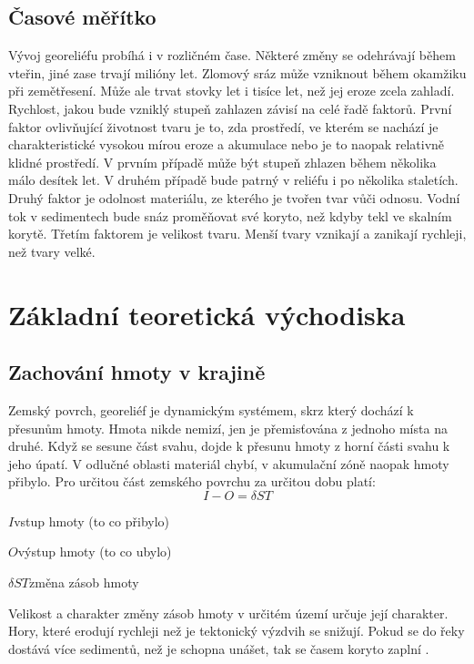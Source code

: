 {\subsection{Časové měřítko}
Vývoj georeliéfu probíhá i v rozličném čase. Některé změny se odehrávají během vteřin, jiné zase trvají milióny let. Zlomový sráz může vzniknout během okamžiku při zemětřesení. Může ale trvat stovky let i tisíce let, než jej eroze zcela zahladí. Rychlost, jakou bude vzniklý stupeň zahlazen závisí na celé řadě faktorů. První faktor ovlivňující životnost tvaru je to, zda prostředí, ve kterém se nachází je charakteristické vysokou mírou eroze a akumulace nebo je to naopak relativně klidné prostředí. V prvním případě může být stupeň zhlazen během několika málo desítek let. V druhém případě bude patrný v reliéfu i po několika staletích. Druhý faktor je odolnost materiálu, ze kterého je tvořen tvar vůči odnosu. Vodní tok v sedimentech bude snáz proměňovat své koryto, než kdyby tekl ve skalním korytě. Třetím faktorem je velikost tvaru. Menší tvary vznikají a zanikají rychleji, než tvary velké. 

\section{Základní teoretická východiska}

\subsection{Zachování hmoty v krajině}
Zemský povrch, georeliéf je dynamickým systémem, skrz který dochází k přesunům hmoty. Hmota nikde nemizí, jen je přemisťována z jednoho místa na druhé. Když se sesune část svahu, dojde k přesunu hmoty z horní části svahu k jeho úpatí. V odlučné oblasti materiál chybí, v akumulační zóně naopak hmoty přibylo. Pro určitou část zemského povrchu za určitou dobu platí: 
\begin{equation}\label{key}
	I-O=\delta ST	
\end{equation}
\begin{eqexpl}
	\item{$I$}vstup hmoty (to co přibylo)
	\item{$O$}výstup hmoty (to co ubylo)
	\item{$\delta ST$}změna zásob hmoty
\end{eqexpl}

Velikost a charakter změny zásob hmoty v určitém území určuje její charakter. Hory, které erodují rychleji než je tektonický výzdvih se snižují. Pokud se do řeky dostává více sedimentů, než je schopna unášet, tak se časem koryto zaplní \parencite{biermanKeyConceptsGeomorphology2014}.

}
